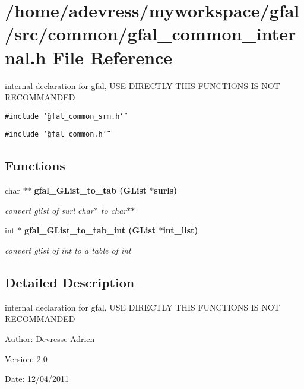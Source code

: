 \section{/home/adevress/myworkspace/gfal/src/common/gfal\_\-common\_\-internal.h File Reference}
\label{gfal__common__internal_8h}
internal declaration for gfal, USE DIRECTLY THIS FUNCTIONS IS NOT RECOMMANDED 

{\tt \#include \char`\"{}gfal\_\-common\_\-srm.h\char`\"{}}\par
{\tt \#include \char`\"{}gfal\_\-common.h\char`\"{}}\par
\subsection*{Functions}
\begin{CompactItemize}
\item 
char $\ast$$\ast$ \bf{gfal\_\-GList\_\-to\_\-tab} (GList $\ast$surls)
\begin{CompactList}\small\item\em convert glist of surl char$\ast$ to char$\ast$$\ast$ \item\end{CompactList}\item 
int $\ast$ \bf{gfal\_\-GList\_\-to\_\-tab\_\-int} (GList $\ast$int\_\-list)
\begin{CompactList}\small\item\em convert glist of int to a table of int \item\end{CompactList}\end{CompactItemize}


\subsection{Detailed Description}
internal declaration for gfal, USE DIRECTLY THIS FUNCTIONS IS NOT RECOMMANDED 

\begin{Desc}
\item[Author:]Devresse Adrien \end{Desc}
\begin{Desc}
\item[Version:]2.0 \end{Desc}
\begin{Desc}
\item[Date:]12/04/2011 \end{Desc}


